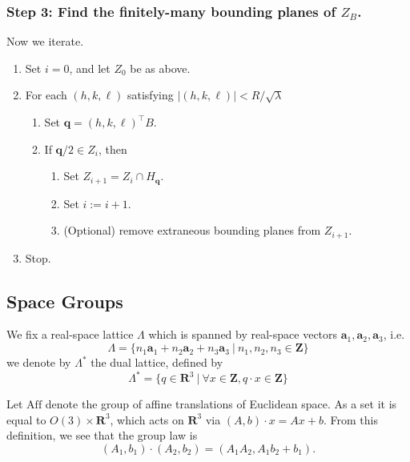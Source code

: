 \documentclass[11pt,a4paper]{article}
\def\v#1{\bm{{#1}}}
\def\tr{^\intercal}
\def\ba{\v{a}}
\def\q{{\v{q}}}
\begin{document}
\subsubsection{Step 3: Find the finitely-many bounding planes of $Z_B$.}

Now we iterate.
\begin{enumerate}
  \item Set $i = 0$, and let $Z_0$ be as above.
  \item For each $(h, k, \ell)$ satisfying $|(h,k,\ell)| < R/\sqrt\lambda$
    \begin{enumerate}
      \item Set $\q = (h,k,\ell)\tr B$.
      \item If $\q/2 \in Z_i$, then
        \begin{enumerate}
          \item Set $Z_{i+1} = Z_i \cap H_\q$.
          \item Set $i := i+1$.
          \item (Optional) remove extraneous bounding planes from $Z_{i+1}$.
        \end{enumerate}
    \end{enumerate}
  \item Stop.
\end{enumerate}


\subsection{Space Groups} \label{spacegroup}

We fix a real-space lattice $\Lambda$ which is spanned by real-space vectors $\ba_1, \ba_2, \ba_3$, i.e.
\begin{equation}
  \Lambda
  = \{ n_1 \ba_1 + n_2 \ba_2 + n_3 \ba_3 \ | \ n_1, n_2, n_3 \in \mathbf{Z} \}
\end{equation}
we denote by $\Lambda^\ast$ the dual lattice, defined by
\begin{equation}
  \Lambda^\ast
  = \{q \in \mathbf{R}^3 \ | \ \forall x \in \mathbf{Z}, q \cdot x \in \mathbf{Z} \}
\end{equation}

Let $\mathrm{Aff}$ denote the group of affine translations of Euclidean space. As a set it is equal to $O(3) \times \mathbf{R}^3$,
which acts on $\mathbf{R}^3$ via $(A, b) \cdot x = Ax + b$. From this definition, we see that the group law is
\begin{equation} (A_1, b_1) \cdot (A_2, b_2) = (A_1 A_2, A_1 b_2 + b_1). \end{equation}
\end{document}
